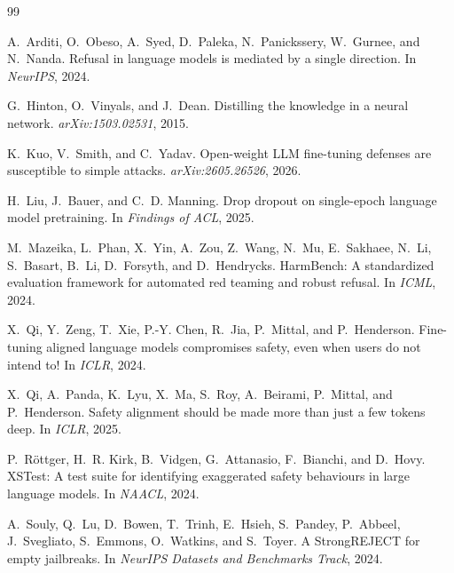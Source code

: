 \documentclass[12pt]{article}
\begin{document}
\begingroup
\small
\setlength{\bibsep}{1pt}
\begin{thebibliography}{99}

A.~Arditi, O.~Obeso, A.~Syed, D.~Paleka, N.~Panickssery, W.~Gurnee, and N.~Nanda.
\newblock Refusal in language models is mediated by a single direction.
\newblock In \emph{NeurIPS}, 2024.

G.~Hinton, O.~Vinyals, and J.~Dean.
\newblock Distilling the knowledge in a neural network.
\newblock \emph{arXiv:1503.02531}, 2015.

K.~Kuo, V.~Smith, and C.~Yadav.
\newblock Open-weight LLM fine-tuning defenses are susceptible to simple attacks.
\newblock \emph{arXiv:2605.26526}, 2026.

H.~Liu, J.~Bauer, and C.~D. Manning.
\newblock Drop dropout on single-epoch language model pretraining.
\newblock In \emph{Findings of ACL}, 2025.

M.~Mazeika, L.~Phan, X.~Yin, A.~Zou, Z.~Wang, N.~Mu, E.~Sakhaee, N.~Li, S.~Basart, B.~Li, D.~Forsyth, and D.~Hendrycks.
\newblock HarmBench: A standardized evaluation framework for automated red teaming and robust refusal.
\newblock In \emph{ICML}, 2024.

X.~Qi, Y.~Zeng, T.~Xie, P.-Y. Chen, R.~Jia, P.~Mittal, and P.~Henderson.
\newblock Fine-tuning aligned language models compromises safety, even when users do not intend to!
\newblock In \emph{ICLR}, 2024.

X.~Qi, A.~Panda, K.~Lyu, X.~Ma, S.~Roy, A.~Beirami, P.~Mittal, and P.~Henderson.
\newblock Safety alignment should be made more than just a few tokens deep.
\newblock In \emph{ICLR}, 2025.

P.~R{\"o}ttger, H.~R. Kirk, B.~Vidgen, G.~Attanasio, F.~Bianchi, and D.~Hovy.
\newblock XSTest: A test suite for identifying exaggerated safety behaviours in large language models.
\newblock In \emph{NAACL}, 2024.

A.~Souly, Q.~Lu, D.~Bowen, T.~Trinh, E.~Hsieh, S.~Pandey, P.~Abbeel, J.~Svegliato, S.~Emmons, O.~Watkins, and S.~Toyer.
\newblock A StrongREJECT for empty jailbreaks.
\newblock In \emph{NeurIPS Datasets and Benchmarks Track}, 2024.


\end{thebibliography}
\end{document}
